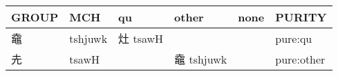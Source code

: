 \documentclass[14pt,a4paper]{scrartcl}
\begin{document}
\begin{longtable}[c]{@{}llllll@{}}
\toprule
\begin{minipage}[b]{0.14\columnwidth}\raggedright\strut
GROUP
\strut\end{minipage} &
\begin{minipage}[b]{0.14\columnwidth}\raggedright\strut
MCH
\strut\end{minipage} &
\begin{minipage}[b]{0.14\columnwidth}\raggedright\strut
qu
\strut\end{minipage} &
\begin{minipage}[b]{0.14\columnwidth}\raggedright\strut
other
\strut\end{minipage} &
\begin{minipage}[b]{0.14\columnwidth}\raggedright\strut
none
\strut\end{minipage} &
\begin{minipage}[b]{0.14\columnwidth}\raggedright\strut
PURITY
\strut\end{minipage}\tabularnewline
\midrule
\endhead
\begin{minipage}[t]{0.14\columnwidth}\raggedright\strut
鼀
\strut\end{minipage} &
\begin{minipage}[t]{0.14\columnwidth}\raggedright\strut
tshjuwk
\strut\end{minipage} &
\begin{minipage}[t]{0.14\columnwidth}\raggedright\strut
灶 tsawH
\strut\end{minipage} &
\begin{minipage}[t]{0.14\columnwidth}\raggedright\strut
\strut\end{minipage} &
\begin{minipage}[t]{0.14\columnwidth}\raggedright\strut
\strut\end{minipage} &
\begin{minipage}[t]{0.14\columnwidth}\raggedright\strut
pure:qu
\strut\end{minipage}\tabularnewline
\begin{minipage}[t]{0.14\columnwidth}\raggedright\strut
圥
\strut\end{minipage} &
\begin{minipage}[t]{0.14\columnwidth}\raggedright\strut
tsawH
\strut\end{minipage} &
\begin{minipage}[t]{0.14\columnwidth}\raggedright\strut
\strut\end{minipage} &
\begin{minipage}[t]{0.14\columnwidth}\raggedright\strut
鼀 tshjuwk
\strut\end{minipage} &
\begin{minipage}[t]{0.14\columnwidth}\raggedright\strut
\strut\end{minipage} &
\begin{minipage}[t]{0.14\columnwidth}\raggedright\strut
pure:other
\strut\end{minipage}\tabularnewline
\bottomrule
\end{longtable}
\end{document}
